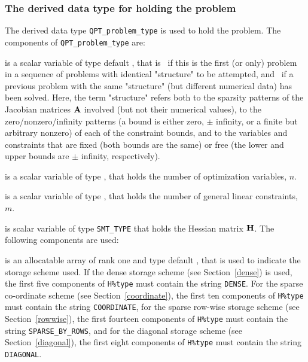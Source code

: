 \documentclass{galahad}
\begin{document}

\subsubsection{The derived data type for holding the problem}\label{typeprob}
The derived data type {\tt QPT\_problem\_type} is used to hold 
the problem. The components of 
{\tt QPT\_problem\_type} 
are:

\begin{description}

 is a scalar variable of type default \logical, 
 that is \true\ if this is the first (or only) problem in a sequence of 
 problems with identical "structure" to be attempted, and \false\ if 
 a previous problem with the same "structure" (but different
 numerical data) has been solved. Here, the term "structure" refers both to 
 the sparsity patterns of the Jacobian matrices ${\mathbf{A}}$ involved 
 (but not their numerical values), to the zero/nonzero/infinity patterns 
 (a bound is either zero, $\pm$ infinity, or a finite but arbitrary 
 nonzero) of each of the constraint bounds, and to the variables and constraints
 that are fixed (both bounds are the same) or free (the lower and upper
 bounds are $\pm$ infinity, respectively).

 is a scalar variable of type \integer, 
 that holds the number of optimization variables, $n$.  
              
 is a scalar variable of type \integer, 
 that holds the number of general linear constraints, $m$.
              
 is scalar variable of type {\tt SMT\_TYPE} 
that holds the Hessian matrix ${\mathbf{H}}$. The following components
are used:

\begin{description}

 is an allocatable array of rank one and type default \character, 
that
is used to indicate the storage scheme used. If the dense storage scheme 
(see Section~\ref{dense}) is used, 
the first five components of {\tt H\%type} must contain the
string {\tt DENSE}.
For the sparse co-ordinate scheme (see Section~\ref{coordinate}), 
the first ten components of {\tt H\%type} must contain the
string {\tt COORDINATE},  
for the sparse row-wise storage scheme (see Section~\ref{rowwise}),
the first fourteen components of {\tt H\%type} must contain the
string {\tt SPARSE\_BY\_ROWS},
and for the diagonal storage scheme (see Section~\ref{diagonal}),
the first eight components of {\tt H\%type} must contain the
string {\tt DIAGONAL}.


\end{description}
\end{description}
\end{document}
